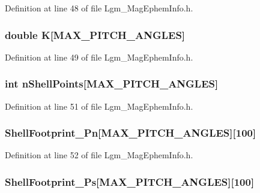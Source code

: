 Definition at line 48 of file Lgm\_\-MagEphemInfo.h.\hypertarget{struct_lgm___mag_ephem_info_2fc48ca4fe570dffe16ef8e235b572a2}{
\subsubsection[{K}]{\setlength{\rightskip}{0pt plus 5cm}double {\bf K}\mbox{[}MAX\_\-PITCH\_\-ANGLES\mbox{]}}}
\label{struct_lgm___mag_ephem_info_2fc48ca4fe570dffe16ef8e235b572a2}




Definition at line 49 of file Lgm\_\-MagEphemInfo.h.\hypertarget{struct_lgm___mag_ephem_info_7209f8815fcdddcb3100909e58729ae7}{
\subsubsection[{nShellPoints}]{\setlength{\rightskip}{0pt plus 5cm}int {\bf nShellPoints}\mbox{[}MAX\_\-PITCH\_\-ANGLES\mbox{]}}}
\label{struct_lgm___mag_ephem_info_7209f8815fcdddcb3100909e58729ae7}




Definition at line 51 of file Lgm\_\-MagEphemInfo.h.\hypertarget{struct_lgm___mag_ephem_info_6476b5f20fa612531c2feca70655d947}{
\subsubsection[{ShellFootprint\_\-Pn}]{ {\bf ShellFootprint\_\-Pn}\mbox{[}MAX\_\-PITCH\_\-ANGLES\mbox{]}\mbox{[}100\mbox{]}}}
\label{struct_lgm___mag_ephem_info_6476b5f20fa612531c2feca70655d947}




Definition at line 52 of file Lgm\_\-MagEphemInfo.h.\hypertarget{struct_lgm___mag_ephem_info_df864bbb783467664daaa3f072931827}{
\subsubsection[{ShellFootprint\_\-Ps}]{ {\bf ShellFootprint\_\-Ps}\mbox{[}MAX\_\-PITCH\_\-ANGLES\mbox{]}\mbox{[}100\mbox{]}}}
\label{struct_lgm___mag_ephem_info_df864bbb783467664daaa3f072931827}




